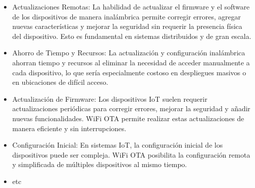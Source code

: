 \begin{appendixd}
        \begin{itemize}
            \item Actualizaciones Remotas: La habilidad de actualizar el firmware y el software de los dispositivos de manera inalámbrica permite corregir errores, 
            agregar nuevas características y mejorar la seguridad sin requerir la presencia física del dispositivo. Esto es 
            fundamental en sistemas distribuidos y de gran escala.
            \item Ahorro de Tiempo y Recursos: La actualización y configuración inalámbrica ahorran tiempo y recursos al 
            eliminar la necesidad de acceder manualmente a cada dispositivo, lo que sería especialmente costoso en 
            despliegues masivos o en ubicaciones de difícil acceso.
            \item Actualización de Firmware: Los dispositivos IoT suelen requerir actualizaciones periódicas para corregir errores, mejorar la seguridad y 
            añadir nuevas funcionalidades. WiFi OTA permite realizar estas actualizaciones de manera eficiente y sin interrupciones.
            \item Configuración Inicial: En sistemas IoT, la configuración inicial de los dispositivos puede ser compleja. WiFi OTA posibilita la 
            configuración remota y simplificada de múltiples dispositivos al mismo tiempo.
            \item etc
        \end{itemize}



\end{appendixd}

